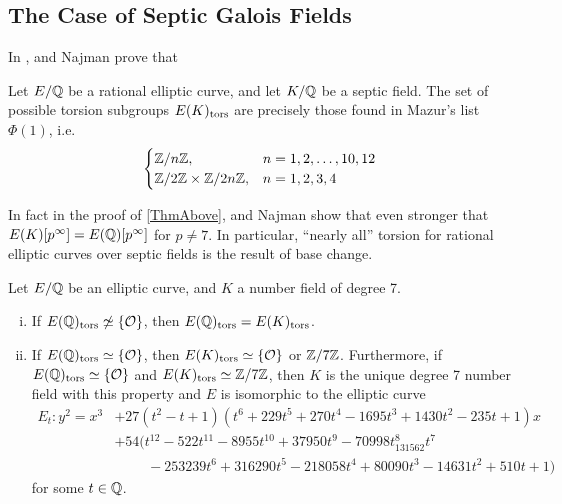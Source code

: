 \subsection{The Case of Septic Galois Fields}

In \cite{gonzalezjimeneznajman20base}, \gonjim{} and Najman prove that 


\begin{thm}
Let $E/\mathbb{Q}$ be a rational elliptic curve, and let $K/\mathbb{Q}$ be a septic field. The set of possible torsion subgroups $E(K)_{\text{tors}}$ are precisely those found in Mazur's list $\Phi(1)$, i.e.
	\[
	\begin{cases}
	\mathbb{Z}/n\mathbb{Z}, & n= 1, 2, \ldots, 10, 12 \\
	\mathbb{Z}/2\mathbb{Z} \times \mathbb{Z}/2n\mathbb{Z}, & n= 1, 2, 3, 4
	\end{cases}
	\]
\end{thm}


In fact in the proof of \ref{ThmAbove}, \gonjim{} and Najman show that even stronger that $E(K)[p^\infty]= E(\mathbb{Q})[p^\infty]$ for $p \neq 7$. In particular, ``nearly all'' torsion for rational elliptic curves over septic fields is the result of base change. 


\begin{prop}
Let $E/\mathbb{Q}$ be an elliptic curve, and $K$ a number field of degree 7.
	\begin{enumerate}[(i)]
	\item If $E(\mathbb{Q})_{\text{tors}} \not\simeq \{\mathcal{O}\}$, then $E(\mathbb{Q})_{\text{tors}}= E(K)_{\text{tors}}$.
	\item If $E(\mathbb{Q})_{\text{tors}} \simeq \{\mathcal{O}\}$, then $E(K)_{\text{tors}} \simeq \{\mathcal{O}\}$ or $\mathbb{Z}/7\mathbb{Z}$. Furthermore, if $E(\mathbb{Q})_{\text{tors}} \simeq \{\mathcal{O}\}$ and $E(K)_{\text{tors}} \simeq \mathbb{Z}/7\mathbb{Z}$, then $K$ is the unique degree 7 number field with this property and $E$ is isomorphic to the elliptic curve
		\[
		\begin{aligned}
		E_t \colon y^2= x^3 &+ 27(t^2 - t + 1)(t^6 + 229t^5 + 270t^4 - 1695t^3 + 1430t^2 - 235t + 1)x \\
		&+ 54(t^{12} - 522t^{11} - 8955t^{10} + 37950t^9 - 70998t^8 _ 131562t^7 \\
		&\phantom{+54..} - 253239t^6 + 316290t^5 - 218058t^4 + 80090t^3 - 14631t^2 + 510t + 1) 
		\end{aligned}
		\]
	for some $t \in \mathbb{Q}$.
	\end{enumerate}
\end{prop}



